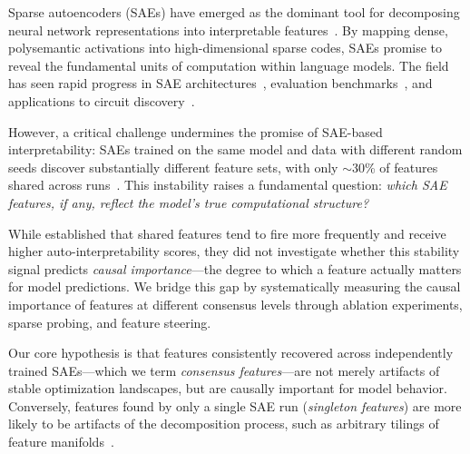 \documentclass{article}
\begin{document}
Sparse autoencoders (SAEs) have emerged as the dominant tool for decomposing neural network representations into interpretable features~\citep{cunningham2023sparse, bricken2023monosemanticity}. By mapping dense, polysemantic activations into high-dimensional sparse codes, SAEs promise to reveal the fundamental units of computation within language models. The field has seen rapid progress in SAE architectures~\citep{gao2024scaling}, evaluation benchmarks~\citep{karvonen2025saebench}, and applications to circuit discovery~\citep{marks2024sparse}.

However, a critical challenge undermines the promise of SAE-based interpretability: SAEs trained on the same model and data with different random seeds discover substantially different feature sets, with only $\sim$30\% of features shared across runs~\citep{paulo2025sparse}. This instability raises a fundamental question: \emph{which SAE features, if any, reflect the model's true computational structure?}

While \citet{paulo2025sparse} established that shared features tend to fire more frequently and receive higher auto-interpretability scores, they did not investigate whether this stability signal predicts \emph{causal importance}---the degree to which a feature actually matters for model predictions. We bridge this gap by systematically measuring the causal importance of features at different consensus levels through ablation experiments, sparse probing, and feature steering.

Our core hypothesis is that features consistently recovered across independently trained SAEs---which we term \emph{consensus features}---are not merely artifacts of stable optimization landscapes, but are causally important for model behavior. Conversely, features found by only a single SAE run (\emph{singleton features}) are more likely to be artifacts of the decomposition process, such as arbitrary tilings of feature manifolds~\citep{michaud2025understanding}.
\end{document}
